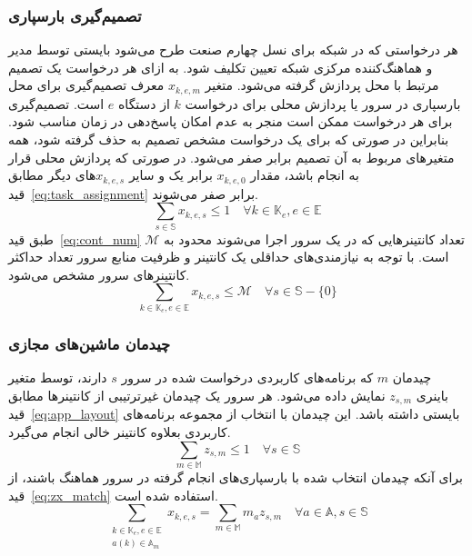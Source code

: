 \subsubsection{تصمیم‌گیری بارسپاری} \label{subsubsec:off_decision}

هر درخواستی که در شبکه  برای نسل چهارم صنعت طرح می‌شود بایستی توسط مدیر و هماهنگ‌کننده مرکزی شبکه تعیین تکلیف شود. به ازای هر درخواست یک تصمیم مرتبط با محل پردازش گرفته می‌شود. متغیر $x_{k,e,m}$ معرف تصمیم‌گیری برای محل  بارسپاری در سرور یا پردازش محلی برای درخواست $k$ از دستگاه $e$ است. تصمیم‌گیری برای هر درخواست ممکن است منجر به عدم امکان پاسخ‌دهی در زمان مناسب شود. بنابراین در صورتی که برای یک درخواست مشخص تصمیم به حذف گرفته شود، همه متغیرهای مربوط به آن تصمیم برابر صفر می‌شود. در صورتی که پردازش محلی قرار به انجام باشد، مقدار $x_{k,e,0}$ برابر یک و سایر $x_{k,e,s}$های دیگر مطابق قید~\eqref{eq:task_assignment} برابر صفر می‌شوند.
\begin{equation} \label{eq:task_assignment}
    \sum_{s \in \mathbb{S}} x_{k,e,s} \leq 1 \quad \forall k \in \mathbb{K}_e, e \in \mathbb{E}
\end{equation}
طبق قید‍~\eqref{eq:cont_num} تعداد کانتینرهایی که در یک سرور اجرا می‌شوند محدود به $\mathcal{M}$ است. با توجه به نیازمندی‌های حداقلی یک کانتینر و ظرفیت منابع سرور تعداد حداکثر کانتینرهای سرور مشخص می‌شود.
\begin{equation} \label{eq:cont_num}
    \sum_{k \in \mathbb{K}_e, e \in \mathbb{E}} x_{k,e,s} \leq \mathcal{M} \quad \forall s \in \mathbb{S} - \{0\}
\end{equation}

\subsubsection{چیدمان ماشین‌های مجازی}
چیدمان $m$ که برنامه‌های کاربردی درخواست شده در سرور $s$ دارند، توسط متغیر باینری $z_{s,m}$ نمایش داده می‌شود. هر سرور یک چیدمان غیرترتیبی از کانتینرها مطابق قید~\eqref{eq:app_layout} بایستی داشته باشد. این چیدمان با انتخاب از مجموعه برنامه‌های کاربردی بعلاوه کانتینر خالی انجام می‌گیرد.
\begin{equation} \label{eq:app_layout}
    \sum_{m \in \mathbb{M}} z_{s,m} \leq 1 \quad \forall s \in \mathbb{S}
\end{equation}
برای آنکه چیدمان انتخاب شده با بارسپاری‌های انجام گرفته در سرور هماهنگ باشند، از قید~\eqref{eq:zx_match} استفاده شده است.
\begin{equation} \label{eq:zx_match}
    \sum_{\substack{k \in \mathbb{K}_e, e \in \mathbb{E} \\ a(k) \in \mathbb{A}_m}} x_{k,e,s} = \sum_{m \in \mathbb{M}} m_a z_{s,m} \quad \forall a \in \mathbb{A}, s \in \mathbb{S}
\end{equation}

